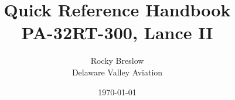 \documentclass{article}
\title{
    Quick Reference Handbook
    \\
    PA-32RT-300, Lance II
}
\date{\today}
\author{
    Rocky Breslow
    \\
    Delaware Valley Aviation
}
\begin{document}
\lsstyle

\begin{titlepage}
    \maketitle
\end{titlepage}

\tableofcontents




\end{document}
